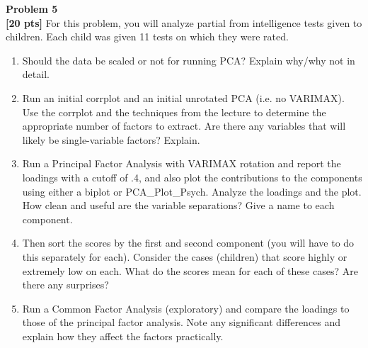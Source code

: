 \documentclass{article}
\newenvironment{problem}[2][Problem]
    { \begin{mdframed}[backgroundcolor=gray!20] \textbf{#1 #2} \\}
    {  \end{mdframed}}
\begin{document}
\begin{problem}{5}
\textbf{[20 pts]}
For this problem, you will analyze partial from intelligence tests given to children. Each child was given 11 tests on which they were rated.
\begin{enumerate}
\item Should the data be scaled or not for running PCA? Explain why/why not in detail.
\item Run an initial corrplot and an initial unrotated PCA (i.e. no VARIMAX). Use the corrplot and the techniques from the lecture to determine the appropriate number of factors to
extract. Are there any variables that will likely be single-variable factors? Explain.
\item Run a Principal Factor Analysis with VARIMAX rotation and report the loadings with a
cutoff of .4, and also plot the contributions to the components using either a biplot or PCA\_Plot\_Psych. Analyze the loadings and the plot. How clean and useful are the variable separations? Give a name to each component.
\item Then sort the scores by the first and second component (you will have to do this separately for each). Consider the cases (children) that score highly or extremely low on each. What do the scores mean for each of these cases? Are there any surprises?
\item Run a Common Factor Analysis (exploratory) and compare the loadings to those of the principal factor analysis. Note any significant differences and explain how they affect the factors practically.
\end{enumerate}
\end{problem}
\end{document}
